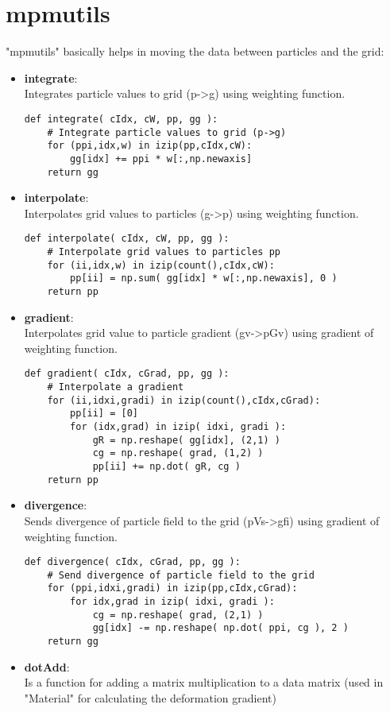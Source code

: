\documentclass[11pt,fleqn]{book} %
\begin{document}
\chapter{mpmutils}
\label{chap:mpmutils}
"mpmutils" basically helps in moving the data between particles and the grid:
\begin{itemize}
\item \textbf{integrate}:\\ Integrates particle values to grid (p->g) using weighting function.
\begin{lstlisting}
def integrate( cIdx, cW, pp, gg ):
    # Integrate particle values to grid (p->g)
    for (ppi,idx,w) in izip(pp,cIdx,cW):
        gg[idx] += ppi * w[:,np.newaxis]
    return gg     
\end{lstlisting}
\item \textbf{interpolate}:\\ Interpolates grid values to particles (g->p) using weighting function.
\begin{lstlisting}
def interpolate( cIdx, cW, pp, gg ):
    # Interpolate grid values to particles pp
    for (ii,idx,w) in izip(count(),cIdx,cW):
        pp[ii] = np.sum( gg[idx] * w[:,np.newaxis], 0 )
    return pp
\end{lstlisting}
\item \textbf{gradient}:\\ Interpolates grid value to particle gradient (gv->pGv) using gradient of weighting function.
\begin{lstlisting}
def gradient( cIdx, cGrad, pp, gg ):
    # Interpolate a gradient
    for (ii,idxi,gradi) in izip(count(),cIdx,cGrad):
        pp[ii] = [0]
        for (idx,grad) in izip( idxi, gradi ):
            gR = np.reshape( gg[idx], (2,1) )
            cg = np.reshape( grad, (1,2) )
            pp[ii] += np.dot( gR, cg )
    return pp    
\end{lstlisting}
\item \textbf{divergence}:\\ Sends divergence of particle field to the grid (pVs->gfi) using gradient of weighting function.
\begin{lstlisting}
def divergence( cIdx, cGrad, pp, gg ):
    # Send divergence of particle field to the grid
    for (ppi,idxi,gradi) in izip(pp,cIdx,cGrad):
        for idx,grad in izip( idxi, gradi ):
            cg = np.reshape( grad, (2,1) )            
            gg[idx] -= np.reshape( np.dot( ppi, cg ), 2 )
    return gg       
\end{lstlisting}
\item \textbf{dotAdd}:\\ Is a function for adding a matrix multiplication to a data matrix (used in "Material" for calculating the deformation gradient)

\end{itemize}
\end{document}
